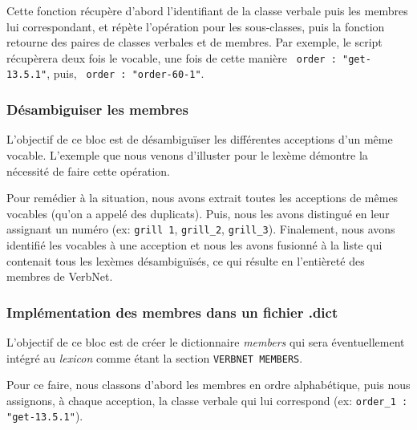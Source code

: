 Cette fonction récupère d'abord l'identifiant de la classe verbale puis les membres lui correspondant, et répète l'opération pour les sous-classes, puis la fonction retourne des paires de classes verbales et de membres. Par exemple, le script récupèrera deux fois le vocable, une fois de cette manière \lstinline| order : "get-13.5.1"|, puis, \lstinline| order : "order-60-1"|.

\subsubsection{Désambiguiser les membres}

L'objectif de ce bloc est de désambiguïser les différentes acceptions d'un même vocable. L'exemple que nous venons d'illuster pour le lexème  démontre la nécessité de faire cette opération.

Pour remédier à la situation, nous avons extrait toutes les acceptions de mêmes vocables (qu'on a appelé des duplicats). Puis, nous les avons distingué en leur assignant un numéro (ex: \texttt{grill 1}, \texttt{grill\_2}, \texttt{grill\_3}). Finalement, nous avons identifié les vocables à une acception et nous les avons fusionné à la liste qui contenait tous les lexèmes désambiguïsés, ce qui résulte en l'entièreté des membres de VerbNet.

\subsubsection{Implémentation des membres dans un fichier .dict}

L'objectif de ce bloc est de créer le dictionnaire \emph{members} qui sera éventuellement intégré au \emph{lexicon} comme étant la section \texttt{VERBNET MEMBERS}.

Pour ce faire, nous classons d'abord les membres en ordre alphabétique, puis nous assignons, à chaque acception, la classe verbale qui lui correspond (ex: \lstinline|order_1 : "get-13.5.1"|).

